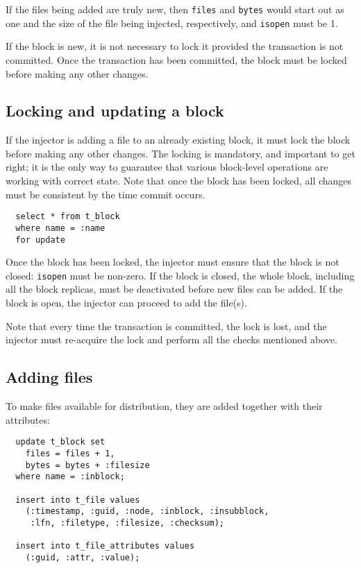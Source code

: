 \documentclass{cmspaper}
\begin{document}
If the files being added are truly new, then \texttt{files} and \texttt{bytes} would start out as one and the size of the file being injected, respectively, and \texttt{isopen} must be 1.

If the block is new, it is not necessary to lock it provided the transaction is not committed.  Once the transaction has been committed, the block must be locked before making any other changes.

\subsection{Locking and updating a block}

If the injector is adding a file to an already existing block, it must lock the block before making any other changes.  The locking is mandatory, and important to get right; it is the only way to guarantee that various block-level operations are working with correct state.  Note that once the block has been locked, all changes must be consistent by the time commit occurs.

{\small\begin{verbatim}
  select * from t_block
  where name = :name
  for update
\end{verbatim}}

Once the block has been locked, the injector must ensure that the block is not closed: \texttt{isopen} must be non-zero.  If the block is closed, the whole block, including all the block replicas, must be deactivated before new files can be added.  If the block is open, the injector can proceed to add the file(s).

Note that every time the transaction is committed, the lock is lost, and the injector must re-acquire the lock and perform all the checks mentioned above.

\subsection{Adding files}

To make files available for distribution, they are added together with their attributes:

{\small\begin{verbatim}
  update t_block set
    files = files + 1,
    bytes = bytes + :filesize
  where name = :inblock;

  insert into t_file values
    (:timestamp, :guid, :node, :inblock, :insubblock,
     :lfn, :filetype, :filesize, :checksum);

  insert into t_file_attributes values
    (:guid, :attr, :value);
\end{verbatim}}
\end{document}
